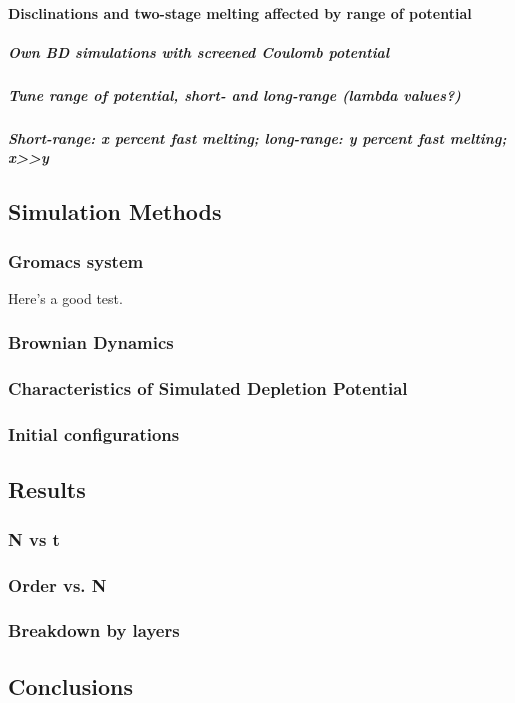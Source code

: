 \documentclass{article}
\begin{document}
\paragraph{Disclinations and two-stage melting affected by range of potential}
\label{sec-2.1.6.2}
\subparagraph{Own BD simulations with screened Coulomb potential}
\label{sec-2.1.6.2.1}
\subparagraph{Tune range of potential, short- and long-range (lambda values?)}
\label{sec-2.1.6.2.2}
\subparagraph{Short-range: x percent fast melting; long-range: y percent fast melting; x>>y}
\label{sec-2.1.6.2.3}
\subsection{Simulation Methods}
\label{sec-2.2}
\subsubsection{Gromacs system}
\label{sec-2.2.1}

Here's a good test. \cite{Deng2009}
\subsubsection{Brownian Dynamics}
\label{sec-2.2.2}
\subsubsection{Characteristics of Simulated Depletion Potential}
\label{sec-2.2.3}
\subsubsection{Initial configurations}
\label{sec-2.2.4}
\subsection{Results}
\label{sec-2.3}
\subsubsection{N vs t}
\label{sec-2.3.1}
\subsubsection{Order vs. N}
\label{sec-2.3.2}
\subsubsection{Breakdown by layers}
\label{sec-2.3.3}
\subsection{Conclusions}
\label{sec-2.4}
\end{document}

